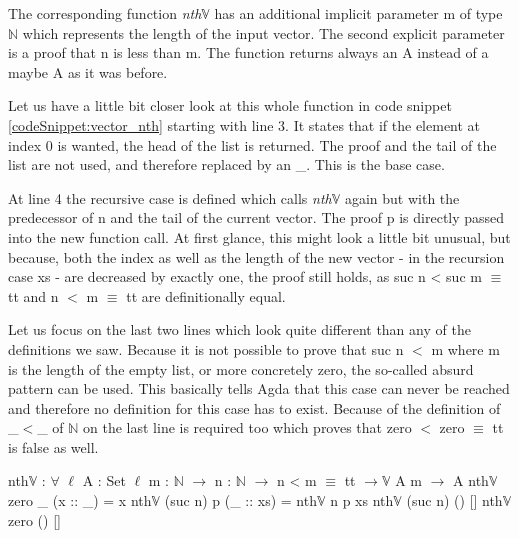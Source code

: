The corresponding function \emph{nth$\mathbb{V}$} has an additional implicit parameter m of type $\mathbb{N}$ which represents the length of the input vector. 
The second explicit parameter is a proof that n is less than m. 
The function returns always an A instead of a maybe A as it was before.

Let us have a little bit closer look at this whole function in code snippet \ref{codeSnippet:vector_nth} starting with line 3. It states that if the element at index 0 is wanted, the head of the list is returned.
The proof and the tail of the list are not used, and therefore replaced by an \_. This is the base case.

At line 4 the recursive case is defined which calls \emph{nth$\mathbb{V}$} again but with the predecessor of n and the tail of the current vector.
The proof p is directly passed into the new function call. At first glance, this might look a little bit unusual, but because, both the index as well as the length of the new vector - in the recursion case xs - 
are decreased by exactly one, the proof still holds, as suc n < suc m $\equiv$ tt and n $<$ m $\equiv$ tt are definitionally equal. 

Let us focus on the last two lines which look quite different than any of the definitions we saw.
Because it is not possible to prove that suc n $<$ m where m is the length of the empty list, or more concretely zero, the so-called absurd pattern can be used. This basically tells Agda that this case can never be reached and therefore no definition for this case has to exist.
Because of the definition of \_$<$\_ of $\mathbb{N}$ on the last line is required too which proves that zero $<$ zero $\equiv$ tt is false as well.  

\begin{codesnippet}[mathescape=true, caption={Definition of \emph{nth} function in Agda}, label={codeSnippet:vector_nth}]
nth$\mathbb{V}$ : $\forall$ {$\ell$} {A : Set $\ell$} {m : $\mathbb{N}$} $\rightarrow$
       n : $\mathbb{N}$ $\rightarrow$ n < m $\equiv$ tt $\rightarrow \mathbb{V}$ A m $\rightarrow$ A
nth$\mathbb{V}$ zero _ (x :: _) = x
nth$\mathbb{V}$ (suc n) p (_ :: xs) = nth$\mathbb{V}$ n p xs
nth$\mathbb{V}$ (suc n) () []
nth$\mathbb{V}$ zero () []
\end{codesnippet}

